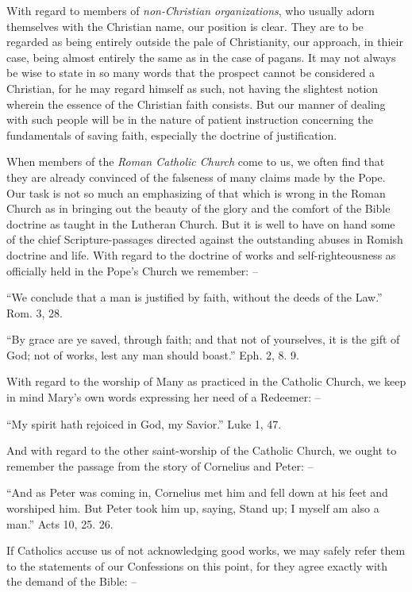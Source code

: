\documentclass[
]{book}
\begin{document}
With regard to members of \emph{non-Christian organizations}, who usually adorn themselves with the Christian name, our position is clear. They are to be regarded as being entirely outside the pale of Christianity, our approach, in thieir case, being almost entirely the same as in the case of pagans. It may not always be wise to state in so many words that the prospect cannot be considered a Christian, for he may regard himself as such, not having the slightest notion wherein the essence of the Christian faith consists. But our manner of dealing with such people will be in the nature of patient instruction concerning the fundamentals of saving faith, especially the doctrine of justification.

When members of the \emph{Roman Catholic Church} come to us, we often find that they are already convinced of the falseness of many claims made by the Pope. Our task is not so much an emphasizing of that which is wrong in the Roman Church as in bringing out the beauty of the glory and the comfort of the Bible doctrine as taught in the Lutheran Church. But it is well to have on hand some of the chief Scripture-passages directed against the outstanding abuses in Romish doctrine and life. With regard to the doctrine of works and self-righteousness as officially held in the Pope's Church we remember: --

``We conclude that a man is justified by faith, without the deeds of the Law.'' Rom. 3, 28.

``By grace are ye saved, through faith; and that not of yourselves, it is the gift of God; not of works, lest any man should boast.'' Eph. 2, 8. 9.

With regard to the worship of Many as practiced in the Catholic Church, we keep in mind Mary's own words expressing her need of a Redeemer: --

``My spirit hath rejoiced in God, my Savior.'' Luke 1, 47.

And with regard to the other saint-worship of the Catholic Church, we ought to remember the passage from the story of Cornelius and Peter: --

``And as Peter was coming in, Cornelius met him and fell down at his feet and worshiped him. But Peter took him up, saying, Stand up; I myself am also a man.'' Acts 10, 25. 26.

If Catholics accuse us of not acknowledging good works, we may safely refer them to the statements of our Confessions on this point, for they agree exactly with the demand of the Bible: --
\end{document}
